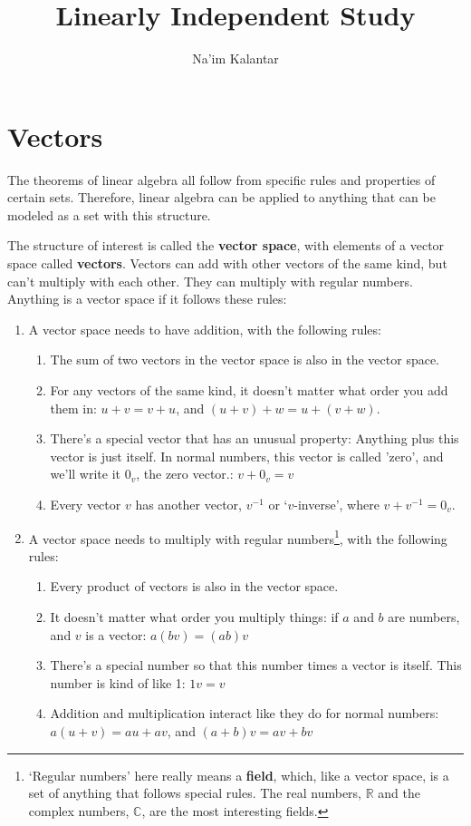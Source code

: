 \documentclass{article}
\title{Linearly Independent Study}
\author{Na'im Kalantar}
\begin{document}
\maketitle
\section{Vectors}
The theorems of linear algebra all follow from specific rules and properties of certain sets. Therefore, linear algebra can be applied to anything that can be modeled as a set with this structure.

The structure of interest is called the \textbf{vector space}, with elements of a vector space called \textbf{vectors}. Vectors can add with other vectors of the same kind, but can't multiply with each other. They can multiply with regular numbers. Anything is a vector space if it follows these rules:
\begin{enumerate}
    \item A vector space needs to have addition, with the following rules:
        \begin{enumerate}
            \item The sum of two vectors in the vector space is also in the vector space.
            \item For any vectors of the same kind, it doesn't matter what order you add them in: $u+v = v+u$, and $(u+v)+w = u+(v+w)$.
            \item There's a special vector that has an unusual property: Anything plus this vector is just itself. In normal numbers, this vector is called 'zero', and we'll write it $0_v$, the zero vector.: $v + 0_v = v$
            \item Every vector $v$ has another vector, $v^{-1}$ or `$v$-inverse', where $v + v^{-1} = 0_v$. 
        \end{enumerate}
    \item A vector space needs to multiply with regular numbers\footnote{`Regular numbers' here really means a \textbf{field}, which, like a vector space, is a set of anything that follows special rules. The real numbers, $\mathbb{R}$ and the complex numbers, $\mathbb{C}$, are the most interesting fields.}, with the following rules:
        \begin{enumerate}
            \item Every product of vectors is also in the vector space. 
            \item It doesn't matter what order you multiply things: if $a$ and $b$ are numbers, and $v$ is a vector: $a(bv) = (ab)v$
            \item There's a special number so that this number times a vector is itself. This number is kind of like 1: $1v = v$
            \item Addition and multiplication interact like they do for normal numbers: $a(u+v) = au + av$, and $(a+b)v = av + bv$
        \end{enumerate}
\end{enumerate}
\end{document}
